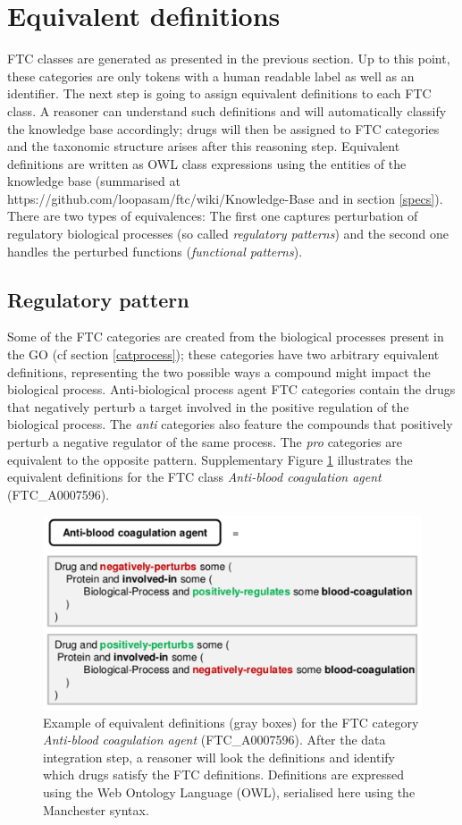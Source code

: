 \documentclass{bioinfo}
\begin{document}
\section{Equivalent definitions}
FTC classes are generated as presented in the previous section. Up to this point, these categories 
are only tokens with a human readable label as well as an identifier. The next step is going to 
assign equivalent definitions to each FTC class. A reasoner can understand such definitions and will automatically 
classify the knowledge base accordingly; drugs will then be assigned to FTC categories and the taxonomic structure 
arises after this reasoning step. Equivalent definitions are written as OWL class expressions using the entities of 
the knowledge base (summarised at {{https://github.com/loopasam/ftc/wiki/Knowledge-Base}} and in section \ref{specs}).
There are two types of equivalences: The first one captures perturbation of regulatory 
biological processes (so called \emph{regulatory patterns}) and the second one handles the perturbed functions (\emph{functional patterns}).

\subsection{Regulatory pattern}
Some of the FTC categories are created from the biological processes present in the 
GO (cf section \ref{catprocess}); these categories have two arbitrary equivalent definitions, representing the 
two possible ways a compound might impact the biological process. Anti-biological process agent FTC categories 
contain the drugs that negatively perturb a target involved in the positive regulation of the biological process. 
The \emph{anti} categories also feature the compounds that positively perturb a negative regulator of the same process. 
The \emph{pro} categories are equivalent to the opposite pattern. Supplementary Figure \ref{fig:S01} illustrates the equivalent definitions for the 
FTC class \emph{Anti-blood coagulation agent} (FTC\_A0007596).
 
\begin{figure}[!tpb]%
\centerline{\includegraphics{figS1.png}}
\caption{Example of equivalent definitions (gray boxes) for the FTC category \emph{Anti-blood coagulation 
agent} (FTC\_A0007596). After the data integration step, a reasoner will look the definitions and identify 
which drugs satisfy the FTC definitions. Definitions are expressed using the Web Ontology Language (OWL), 
serialised here using the Manchester syntax.}\label{fig:S01}
\end{figure}
\end{document}
